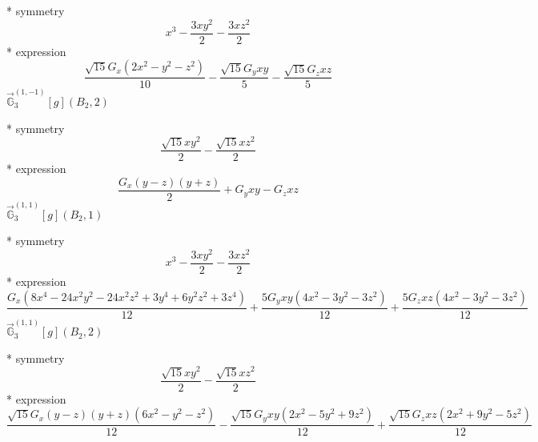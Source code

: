 \documentclass[fleqn,8pt]{jsarticle}
\begin{document}
\noindent\quad ** symmetry
\begin{dmath*}
x^{3} - \frac{3 x y^{2}}{2} - \frac{3 x z^{2}}{2}
\end{dmath*}
\noindent\quad ** expression
\begin{dmath*}
\frac{\sqrt{15} G_{x} \left(2 x^{2} - y^{2} - z^{2}\right)}{10} - \frac{\sqrt{15} G_{y} x y}{5} - \frac{\sqrt{15} G_{z} x z}{5}
\end{dmath*}
\noindent\quad $\vec{\mathbb{G}}_{3}^{(1,-1)}[g](B_{2},2)$

\noindent\quad ** symmetry
\begin{dmath*}
\frac{\sqrt{15} x y^{2}}{2} - \frac{\sqrt{15} x z^{2}}{2}
\end{dmath*}
\noindent\quad ** expression
\begin{dmath*}
\frac{G_{x} \left(y - z\right) \left(y + z\right)}{2} + G_{y} x y - G_{z} x z
\end{dmath*}
\noindent\quad $\vec{\mathbb{G}}_{3}^{(1,1)}[g](B_{2},1)$

\noindent\quad ** symmetry
\begin{dmath*}
x^{3} - \frac{3 x y^{2}}{2} - \frac{3 x z^{2}}{2}
\end{dmath*}
\noindent\quad ** expression
\begin{dmath*}
\frac{G_{x} \left(8 x^{4} - 24 x^{2} y^{2} - 24 x^{2} z^{2} + 3 y^{4} + 6 y^{2} z^{2} + 3 z^{4}\right)}{12} + \frac{5 G_{y} x y \left(4 x^{2} - 3 y^{2} - 3 z^{2}\right)}{12} + \frac{5 G_{z} x z \left(4 x^{2} - 3 y^{2} - 3 z^{2}\right)}{12}
\end{dmath*}
\noindent\quad $\vec{\mathbb{G}}_{3}^{(1,1)}[g](B_{2},2)$

\noindent\quad ** symmetry
\begin{dmath*}
\frac{\sqrt{15} x y^{2}}{2} - \frac{\sqrt{15} x z^{2}}{2}
\end{dmath*}
\noindent\quad ** expression
\begin{dmath*}
\frac{\sqrt{15} G_{x} \left(y - z\right) \left(y + z\right) \left(6 x^{2} - y^{2} - z^{2}\right)}{12} - \frac{\sqrt{15} G_{y} x y \left(2 x^{2} - 5 y^{2} + 9 z^{2}\right)}{12} + \frac{\sqrt{15} G_{z} x z \left(2 x^{2} + 9 y^{2} - 5 z^{2}\right)}{12}
\end{dmath*}
\end{document}
